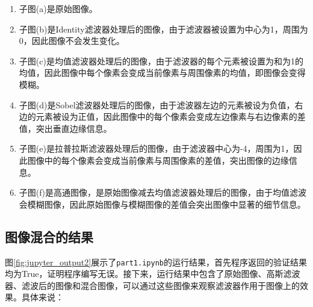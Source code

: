 \documentclass{article}
\begin{document}
\begin{enumerate}
    \item 子图(a)是原始图像。
    \item 子图(b)是Identity滤波器处理后的图像，由于滤波器被设置为中心为1，周围为0，因此图像不会发生变化。
    \item 子图(c)是均值滤波器处理后的图像，由于滤波器的每个元素被设置为和为1的均值，因此图像中每个像素会变成当前像素与周围像素的均值，即图像会变得模糊。
    \item 子图(d)是Sobel滤波器处理后的图像，由于滤波器左边的元素被设为负值，右边的元素被设为正值，因此图像中的每个像素会变成左边像素与右边像素的差值，突出垂直边缘信息。
    \item 子图(e)是拉普拉斯滤波器处理后的图像，由于滤波器中心为-4，周围为1，因此图像中的每个像素会变成当前像素与周围像素的差值，突出图像的边缘信息。
    \item 子图(f)是高通图像，是原始图像减去均值滤波器处理后的图像，由于均值滤波会模糊图像，因此原始图像与模糊图像的差值会突出图像中显著的细节信息。
\end{enumerate}

\subsection{图像混合的结果}

图\ref{fig:jupyter_output2}展示了\texttt{part1.ipynb}的运行结果，首先程序返回的验证结果均为True，证明程序编写无误。接下来，运行结果中包含了原始图像、高斯滤波器、滤波后的图像和混合图像，可以通过这些图像来观察滤波器作用于图像上的效果。具体来说：
\end{document}
